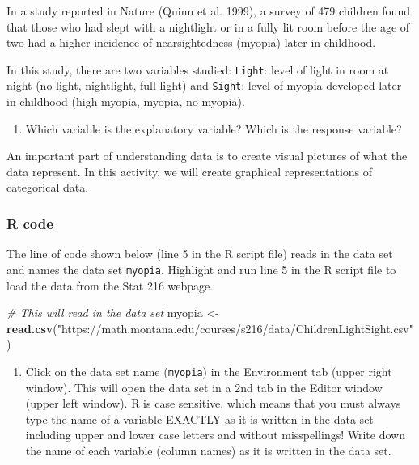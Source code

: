 \documentclass[
]{report}
\newenvironment{Shaded}{\begin{snugshade}}{\end{snugshade}}
\newcommand{\CommentTok}[1]{\textcolor[rgb]{0.56,0.35,0.01}{\textit{#1}}}
\newcommand{\FunctionTok}[1]{\textcolor[rgb]{0.13,0.29,0.53}{\textbf{#1}}}
\newcommand{\NormalTok}[1]{#1}
\newcommand{\OtherTok}[1]{\textcolor[rgb]{0.56,0.35,0.01}{#1}}
\newcommand{\StringTok}[1]{\textcolor[rgb]{0.31,0.60,0.02}{#1}}
\providecommand{\tightlist}{%
  \setlength{\itemsep}{0pt}\setlength{\parskip}{0pt}}
\begin{document}
In a study reported in Nature (Quinn et al. 1999), a survey of 479 children found that those who had slept with a nightlight or in a fully lit room before the age of two had a higher incidence of nearsightedness (myopia) later in childhood.

In this study, there are two variables studied: \texttt{Light}: level of light in room at night (no light, nightlight, full light) and \texttt{Sight}: level of myopia developed later in childhood (high myopia, myopia, no myopia).

\begin{enumerate}
\def\labelenumi{\arabic{enumi}.}
\tightlist
\item
  Which variable is the explanatory variable? Which is the response variable?
\end{enumerate}

\vspace{0.8in}

An important part of understanding data is to create visual pictures of what the data represent. In this activity, we will create graphical representations of categorical data.

\subsubsection*{R code}\label{r-code}

The line of code shown below (line 5 in the R script file) reads in the data set and names the data set \texttt{myopia}. Highlight and run line 5 in the R script file to load the data from the Stat 216 webpage.

\begin{Shaded}
\begin{Highlighting}[]
\CommentTok{\# This will read in the data set}
\NormalTok{myopia }\OtherTok{\textless{}{-}} \FunctionTok{read.csv}\NormalTok{(}\StringTok{"https://math.montana.edu/courses/s216/data/ChildrenLightSight.csv"}\NormalTok{) }
\end{Highlighting}
\end{Shaded}

\begin{enumerate}
\def\labelenumi{\arabic{enumi}.}
\setcounter{enumi}{1}
\tightlist
\item
  Click on the data set name (\texttt{myopia}) in the Environment tab (upper right window). This will open the data set in a 2nd tab in the Editor window (upper left window). R is case sensitive, which means that you must always type the name of a variable EXACTLY as it is written in the data set including upper and lower case letters and without misspellings! Write down the name of each variable (column names) as it is written in the data set.
\end{enumerate}
\end{document}

